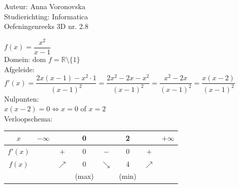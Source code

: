 \documentclass[a4paper]{article}
\begin{document}
  
\noindent \large Auteur: Anna Voronovska \\
\noindent \large Studierichting: Informatica\\
\noindent \large Oefeningenreeks 3D nr. 2.8\\

\medskip

\normalsize


$f(x) = \dfrac{x^2}{x-1}$\\

Domein: $\text{dom } f = \mathbb{R} \setminus \{1\}$\\

Afgeleide:\\

$ f'(x) = \dfrac{2x(x-1) - x^2 \cdot 1}{(x-1)^2} = \dfrac{2x^2 - 2x - x^2}{(x-1)^2} = \dfrac{x^2 - 2x}{(x-1)^2} = \dfrac{x(x-2)}{(x-1)^2} $\\

Nulpunten:\\

$x(x-2) = 0 \Leftrightarrow x = 0$ of $x = 2$\\

Verloopschema:\\

\begin{center}
\renewcommand{\arraystretch}{1.5}
\begin{tabular}{c|ccccccc}
$x$     & $-\infty$ &            & 0     &            & 2     &            & $+\infty$ \\ \hline
$f'(x)$ &           & $+$        & 0     & $-$        & 0     & $+$        & \\ \hline
$f(x)$  &           & $\nearrow$ & 0     & $\searrow$ & 4     & $\nearrow$ & \\
        &           &            & (max) &            & (min) &            & 
\end{tabular}
\end{center}
\end{document}
